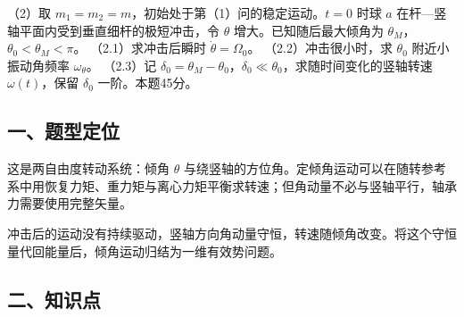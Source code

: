 \documentclass[12pt,a4paper,fontset=fandol]{ctexart}
\begin{document}
（2）取 \(m_1=m_2=m\)，初始处于第（1）问的稳定运动。\(t=0\) 时球 \(a\)
在杆---竖轴平面内受到垂直细杆的极短冲击，令 \(\theta\)
增大。已知随后最大倾角为 \(\theta_M\)，\(\theta_0<\theta_M<\pi\)。
（2.1）求冲击后瞬时 \(\dot\theta=\Omega_0\)。 （2.2）冲击很小时，求
\(\theta_0\) 附近小振动角频率 \(\omega_\theta\)。 （2.3）记
\(\delta_0=\theta_M-\theta_0\)，\(\delta_0\ll\theta_0\)，求随时间变化的竖轴转速
\(\omega(t)\)，保留 \(\delta_0\) 一阶。本题45分。

\begin{center}
\begin{minipage}{\linewidth}
\centering\begingroup
{}
\ifdim\wd\diagrambox>.88\linewidth
\sbox{\diagrambox}{\resizebox{.88\linewidth}{!}{\usebox{\diagrambox}}}
\fi
\ifdim\ht\diagrambox>.40\textheight
\resizebox{!}{.40\textheight}{\usebox{\diagrambox}}
\else\usebox{\diagrambox}\fi
\par{}
\endgroup\end{minipage}
\end{center}

\subsection{一、题型定位}\label{ux4e00ux9898ux578bux5b9aux4f4d-5}

这是两自由度转动系统：倾角 \(\theta\)
与绕竖轴的方位角。定倾角运动可以在随转参考系中用恢复力矩、重力矩与离心力矩平衡求转速；但角动量不必与竖轴平行，轴承力需要使用完整矢量。

冲击后的运动没有持续驱动，竖轴方向角动量守恒，转速随倾角改变。将这个守恒量代回能量后，倾角运动归结为一维有效势问题。

\subsection{二、知识点}\label{ux4e8cux77e5ux8bc6ux70b9-5}
\end{document}
